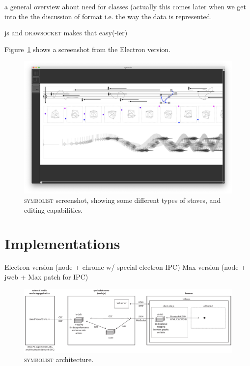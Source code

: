 \documentclass{article}
\def\symbolist{\textsc{symbolist}\xspace}
\def\drawsocket{\textsc{drawsocket}\xspace}
\begin{document}
\cite{hajdu2005quintet}

a general overview about need for classes (actually this comes later when we get into the the discussion of format i.e. the way the data is represented.

js and \drawsocket makes that easy(-ier)


Figure~\ref{fig:screenshot} shows a screenshot from the Electron version.


\begin{figure}[ht!]
\centering
\includegraphics[width=2\columnwidth]{symbolist.png}
\caption{ \symbolist screenshot, showing some different types of staves, and editing capabilities.
\label{fig:screenshot}}
\end{figure}


\section{Implementations}\label{sec:implementations}

Electron version (node + chrome w/ special electron IPC)
Max version (node + jweb + Max patch for IPC)


\begin{figure}[ht!]
\centering
\includegraphics[width=2\columnwidth]{symbolist-architecture2.pdf}
\caption{ \symbolist architecture.
\label{fig:architecture}}
\end{figure}
\end{document}

